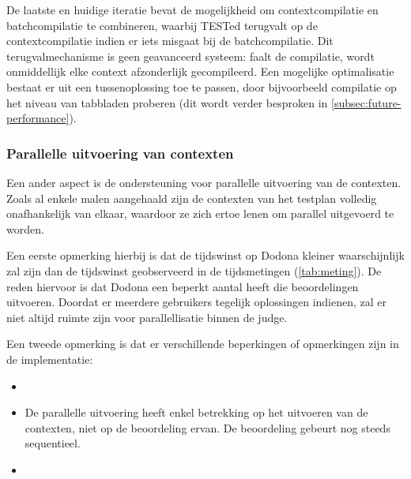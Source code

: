 De laatste en huidige iteratie bevat de mogelijkheid om contextcompilatie en batchcompilatie te combineren, waarbij TESTed terugvalt op de contextcompilatie indien er iets misgaat bij de batchcompilatie.
Dit terugvalmechanisme is geen geavanceerd systeem: faalt de compilatie, wordt onmiddellijk elke context afzonderlijk gecompileerd.
Een mogelijke optimalisatie bestaat er uit een tussenoplossing toe te passen, door bijvoorbeeld compilatie op het niveau van tabbladen proberen (dit wordt verder besproken in \cref{subsec:future-performance}).

\subsubsection{Parallelle uitvoering van contexten}

Een ander aspect is de ondersteuning voor parallelle uitvoering van de contexten.
Zoals al enkele malen aangehaald zijn de contexten van het testplan volledig onafhankelijk van elkaar, waardoor ze zich ertoe lenen om parallel uitgevoerd te worden.

Een eerste opmerking hierbij is dat de tijdswinst op Dodona kleiner waarschijnlijk zal zijn dan de tijdswinst geobserveerd in de tijdsmetingen (\cref{tab:meting}).
De reden hiervoor is dat Dodona een beperkt aantal  heeft die beoordelingen uitvoeren.
Doordat er meerdere gebruikers tegelijk oplossingen indienen, zal er niet altijd ruimte zijn voor parallellisatie binnen de judge.

Een tweede opmerking is dat er verschillende beperkingen of opmerkingen zijn in de implementatie:

\begin{itemize}
    \item
    \item De parallelle uitvoering heeft enkel betrekking op het uitvoeren van de contexten, niet op de beoordeling ervan.
    De beoordeling gebeurt nog steeds sequentieel.
    \item

\end{itemize}

